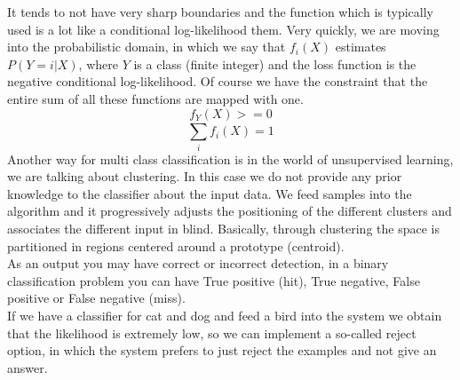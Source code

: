 It tends to not have very sharp boundaries and the function which is typically used is a lot like a conditional log-likelihood them.
Very quickly, we are moving into the probabilistic domain, in which we say that $f_i(X)$ estimates $P(Y=i|X)$, where $Y$ is a class (finite integer) and the loss function is the negative conditional log-likelihood.
Of course we have the constraint that the entire sum of all these functions are mapped with one. \[f_Y(X)>= 0\] \[\sum_{i}^{}f_i(X)=1\] 
Another way for multi class classification is in the world of unsupervised learning, we are talking about clustering. In this case we do not provide any prior knowledge to the classifier about the input data.
We feed samples into the algorithm and it progressively adjusts the positioning of the different clusters and associates the different input in blind. Basically, through clustering the space is partitioned in regions centered around a prototype (centroid).
\\
As an output you may have correct or incorrect detection, in a binary classification problem you can have True positive (hit), True negative, False positive or False negative (miss).
\\
If we have a classifier for cat and dog and feed a bird into the system we obtain that the likelihood is extremely low, so we can implement a so-called reject option, in which the system prefers to just reject the examples and not give an answer. 
